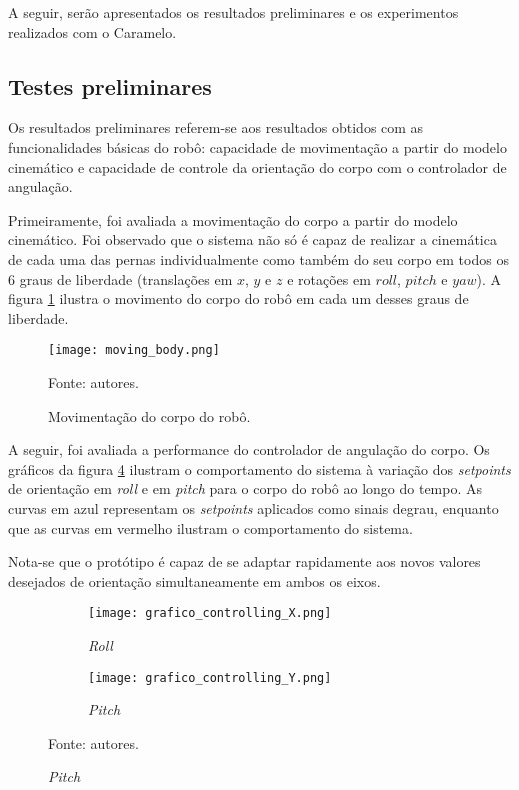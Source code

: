 \documentclass[../main.tex]{subfiles}
\begin{document}
  A seguir, serão apresentados os resultados preliminares e os experimentos realizados com o Caramelo. 
  
  \subsection{Testes preliminares}
  
  Os resultados preliminares referem-se aos resultados obtidos com as funcionalidades básicas do robô: capacidade de movimentação a partir do modelo cinemático e capacidade de controle da orientação do corpo com o controlador de angulação.

  Primeiramente, foi avaliada a movimentação do corpo a partir do modelo cinemático. Foi observado que o sistema não só é capaz de realizar a cinemática de cada uma das pernas individualmente como também do seu corpo em todos os 6 graus de liberdade (translações em $x$, $y$ e $z$ e rotações em $roll$, $pitch$ e $yaw$). A figura \ref{fig:moving_body} ilustra o movimento do corpo do robô em cada um desses graus de liberdade.

  \begin{figure}[!htb]
    \centering
    \caption{Movimentação do corpo do robô.}
    \texttt{[image: moving\_body.png]}
    
    Fonte: autores.
    \label{fig:moving_body}
  \end{figure}

  A seguir, foi avaliada a performance do controlador de angulação do corpo. Os gráficos da figura \ref{fig:grafico_controlling} ilustram o comportamento do sistema à variação dos \textit{setpoints} de orientação em \textit{roll} e em \textit{pitch} para o corpo do robô ao longo do tempo. As curvas em azul representam os \textit{setpoints} aplicados como sinais degrau, enquanto que as curvas em vermelho ilustram o comportamento do sistema.
  
  Nota-se que o protótipo é capaz de se adaptar rapidamente aos novos valores desejados de orientação simultaneamente em ambos os eixos.

  \begin{figure}[!htb]
    \centering
    \caption{Respostas dos controles de angulação.}
    \begin{subfigure}[t]{0.48\textwidth}
      \centering
      \texttt{[image: grafico\_controlling\_X.png]}
      \caption{\textit{Roll}}
      \label{fig:controlling_roll}
    \end{subfigure}
    \begin{subfigure}[t]{0.48\textwidth}
      \centering
      \texttt{[image: grafico\_controlling\_Y.png]}
      \caption{\textit{Pitch}}
      \label{fig:controlling_pitch}
    \end{subfigure}
    
    Fonte: autores.
    \label{fig:grafico_controlling}
  \end{figure}
\end{document}
